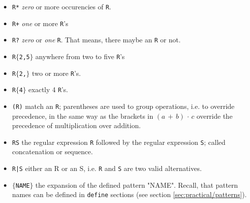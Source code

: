 \begin{itemize}

\item {\tt R*} {\it zero} or more occurencies of {\tt R}.

\item {\tt R+} {\it one} or more {\tt R}'s

\item {\tt R?} {\it zero} or {\it one} {\tt R}. That means, there maybe an {\tt R} or not.

\item {\tt R$\{$2,5$\}$} anywhere from two to five {\tt R}'s

\item {\tt R$\{$2,$\}$} two or more {\tt R}'s.

\item {\tt R$\{$4$\}$} exactly 4 {\tt R}'s.

\item {\tt (R)} match an {\tt R}; parentheses are used to group operations, i.e. to override precedence,
                in the same way as the brackets in $(a\, +\, b)\,\cdot\,c$ override the precedence of 
		multiplication over addition.

\item {\tt RS} the regular expression {\tt R} followed by the regular expression {\tt S};
     called concatenation or sequence.

\item {\tt R|S} either an R or an S, i.e. {\tt R} and {\tt S} are two valid alternatives.

\item {\tt $\{$NAME$\}$} the expansion of the defined pattern "NAME". Recall, that pattern
      names can be defined in {\tt define} sections
      (see section \ref{sec:practical/patterns}).

\end{itemize}
